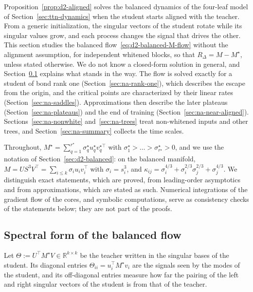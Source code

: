 \documentclass[11pt]{article}
\newcommand{\R}{\mathbb{R}}
\theoremstyle{definition}
\numberwithin{equation}{section}
\begin{document}
Proposition~\ref{prop:d2-aligned} solves the balanced dynamics of the four-leaf model of Section~\ref{sec:ttn-dynamics} when the student starts aligned with the teacher. From a generic initialization, the singular vectors of the student rotate while its singular values grow, and each process changes the signal that drives the other. This section studies the balanced flow~\eqref{eq:d2-balanced-M-flow} without the alignment assumption, for independent whitened blocks, so that $R_\Delta=M-M^\star$, unless stated otherwise. We do not know a closed-form solution in general, and Section~\ref{sec:na-spectral} explains what stands in the way. The flow is solved exactly for a student of bond rank one (Section~\ref{sec:na-rank-one}), which describes the escape from the origin, and the critical points are characterized by their linear rates (Section~\ref{sec:na-saddles}). Approximations then describe the later plateaus (Section~\ref{sec:na-plateaus}) and the end of training (Section~\ref{sec:na-near-aligned}). Sections~\ref{sec:na-nonwhite} and~\ref{sec:na-trees} treat non-whitened inputs and other trees, and Section~\ref{sec:na-summary} collects the time scales.

Throughout, $M^\star=\sum_{q=1}^{r^\star}\sigma^\star_qu^\star_qv^{\star\top}_q$ with $\sigma^\star_1>\dots>\sigma^\star_{r^\star}>0$, and we use the notation of Section~\ref{sec:d2-balanced}: on the balanced manifold, $M=US^3V^\top=\sum_{i\le k}\sigma_iu_iv_i^\top$ with $\sigma_i=s_i^3$, and $\kappa_{ij}=\sigma_i^{4/3}+\sigma_i^{2/3}\sigma_j^{2/3}+\sigma_j^{4/3}$. We distinguish exact statements, which are proved, from leading-order asymptotics and from approximations, which are stated as such. Numerical integrations of the gradient flow of the cores, and symbolic computations, serve as consistency checks of the statements below; they are not part of the proofs.

\subsection{Spectral form of the balanced flow}\label{sec:na-spectral}

Let $\Theta:=U^\top M^\star V\in\R^{k\times k}$ be the teacher written in the singular bases of the student. Its diagonal entries $\Theta_{ii}=u_i^\top M^\star v_i$ are the signals seen by the modes of the student, and its off-diagonal entries measure how far the pairing of the left and right singular vectors of the student is from that of the teacher.
\end{document}
